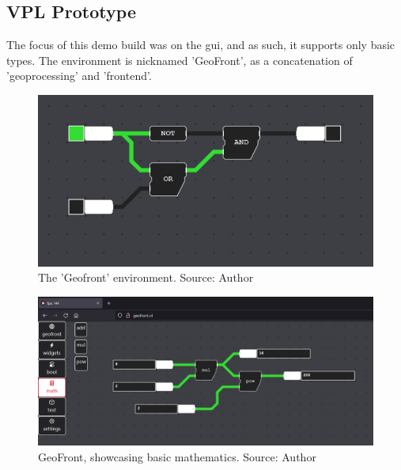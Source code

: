 \subsection{VPL Prototype}
\label{sec:preliminary-vpl}

The focus of this demo build was on the \ac{gui}, and as such, it supports only basic types. The environment is nicknamed 'GeoFront', as a concatenation of 'geoprocessing' and 'frontend'. 

\begin{figure}[!tbp]
  \centering
  \begin{minipage}[b]{1.0\textwidth}
    \includegraphics[width=\textwidth]{../images/geofront-1.PNG}
    \caption{The 'Geofront' environment. Source: Author}
    \label{fig:geofront-1}
  \end{minipage}
\end{figure}


\begin{figure}[!tbp]
  \centering
  \begin{minipage}[b]{1.0\textwidth}
    \includegraphics[width=\textwidth]{../images/geofront-2.PNG}
    \caption{GeoFront, showcasing basic mathematics. Source: Author}
    \label{fig:geofront-2}
  \end{minipage}
\end{figure}


